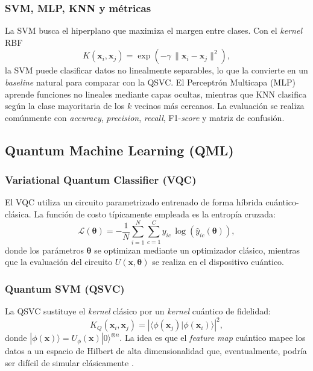\documentclass[a4paper,10pt,twocolumn]{article}
\begin{document}
\subsubsection{SVM, MLP, KNN y m\'etricas}
La SVM busca el hiperplano que maximiza el margen entre clases. Con el
\textit{kernel} RBF
\begin{equation}
K(\mathbf{x}_i, \mathbf{x}_j) =
\exp\!\left(-\gamma\,\|\mathbf{x}_i - \mathbf{x}_j\|^2\right),
\end{equation}
la SVM puede clasificar datos no linealmente separables, lo que la
convierte en un \textit{baseline} natural para comparar con la QSVC.
El Perceptr\'on Multicapa (MLP) aprende funciones no lineales mediante
capas ocultas, mientras que KNN clasifica seg\'un la clase mayoritaria
de los $k$ vecinos m\'as cercanos. La evaluaci\'on se realiza
com\'unmente con \textit{accuracy}, \textit{precision}, \textit{recall},
F1-\textit{score} y matriz de confusi\'on.

\subsection{Quantum Machine Learning (QML)}

\subsubsection{Variational Quantum Classifier (VQC)}
El VQC \citep{havlicek2019} utiliza un circuito parametrizado entrenado
de forma h\'ibrida cu\'antico-cl\'asica. La funci\'on de costo
t\'ipicamente empleada es la entrop\'ia cruzada:
\begin{equation}
\mathcal{L}(\boldsymbol{\theta}) = -\frac{1}{N}\sum_{i=1}^{N}\sum_{c=1}^{C}
y_{ic}\,\log\!\left(\hat{y}_{ic}(\boldsymbol{\theta})\right),
\end{equation}
donde los par\'ametros $\boldsymbol{\theta}$ se optimizan mediante un
optimizador cl\'asico, mientras que la evaluaci\'on del circuito
$U(\mathbf{x},\boldsymbol{\theta})$ se realiza en el dispositivo
cu\'antico.

\subsubsection{Quantum SVM (QSVC)}
La QSVC \citep{rebentrost2014, havlicek2019} sustituye el \textit{kernel}
cl\'asico por un \textit{kernel} cu\'antico de fidelidad:
\begin{equation}
K_Q(\mathbf{x}_i, \mathbf{x}_j) =
\left|\langle\phi(\mathbf{x}_j)|\phi(\mathbf{x}_i)\rangle\right|^2,
\end{equation}
donde $|\phi(\mathbf{x})\rangle = U_\phi(\mathbf{x})|0\rangle^{\otimes n}$.
La idea es que el \textit{feature map} cu\'antico mapee los datos a un
espacio de Hilbert de alta dimensionalidad que, eventualmente, podr\'ia
ser dif\'icil de simular cl\'asicamente \citep{schuld2019}.
\end{document}
